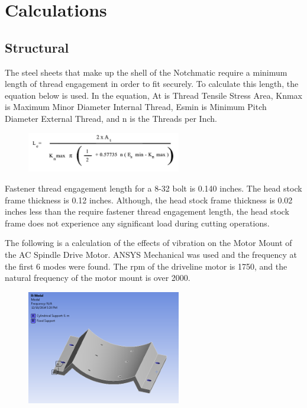 \chapter{Calculations}

\section{Structural}

The steel sheets that make up the shell of the Notchmatic require a minimum length of thread engagement in order to fit securely. To calculate this length, the equation below is used. In the equation, At is Thread Tensile Stress Area, Knmax is Maximum Minor Diameter Internal Thread, Esmin is Minimum Pitch Diameter External Thread, and n is the Threads per Inch. 

\begin{figure}[H]
    \centering
    \includegraphics[width=0.6\textwidth]{./images/Chapter3-Calculations/ShellThread}
    \label{fig:ThreadEng}
\end{figure}

Fastener thread engagement length for a 8-32 bolt is 0.140 inches. The head stock frame thickness is 0.12 inches. Although, the head stock frame thickness is 0.02 inches less than the require fastener thread engagement length, the head stock frame does not experience any significant load during cutting operations. 

\newpage

The following is a calculation of the effects of vibration on the Motor Mount of the AC Spindle Drive Motor. ANSYS Mechanical was used and the frequency at the first 6 modes were found. The rpm of the driveline motor is 1750, and the natural frequency of the motor mount is over 2000.

\begin{figure}[H]
    \centering
    \includegraphics[width=0.6\textwidth]{./images/Chapter3-Calculations/AnsysMotorMount}
    \label{fig:MM1}
\end{figure}

